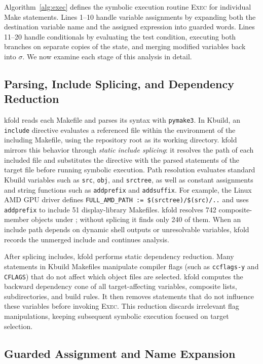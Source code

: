 \documentclass[acmsmall]{acmart}
\newcommand{\tool}{\textsf{kfold}\xspace}
\begin{document}
Algorithm~\ref{alg:exec} defines the symbolic execution routine \textsc{Exec} for individual Make statements.
Lines 1--10 handle variable assignments by expanding both the destination variable name and the assigned expression into guarded words.
Lines 11--20 handle conditionals by evaluating the test condition, executing both branches on separate copies of the state, and merging modified variables back into $\sigma$.
We now examine each stage of this analysis in detail.

\subsection{Parsing, Include Splicing, and Dependency Reduction}\label{sec:technique:include}

\tool reads each Makefile and parses its syntax with \texttt{pymake3}.
In Kbuild, an \texttt{include} directive evaluates a referenced file within the environment of the including Makefile, using the repository root as its working directory.
\tool mirrors this behavior through \emph{static include splicing}: it resolves the path of each included file and substitutes the directive with the parsed statements of the target file before running symbolic execution.
Path resolution evaluates standard Kbuild variables such as \texttt{src}, \texttt{obj}, and \texttt{srctree}, as well as constant assignments and string functions such as \texttt{addprefix} and \texttt{addsuffix}.
For example, the Linux AMD GPU driver defines \texttt{FULL\_AMD\_PATH := \$(srctree)/\$(src)/..} and uses \texttt{addprefix} to include 51 display-library Makefiles.
\tool resolves 742 composite-member objects under ; without splicing it finds only 240 of them.
When an include path depends on dynamic shell outputs or unresolvable variables, \tool records the unmerged include and continues analysis.

After splicing includes, \tool performs static dependency reduction.
Many statements in Kbuild Makefiles manipulate compiler flags (such as \texttt{ccflags-y} and \texttt{CFLAGS}) that do not affect which object files are selected.
\tool computes the backward dependency cone of all target-affecting variables, composite lists, subdirectories, and build rules.
It then removes statements that do not influence these variables before invoking \textsc{Exec}.
This reduction discards irrelevant flag manipulations, keeping subsequent symbolic execution focused on target selection.

\subsection{Guarded Assignment and Name Expansion}\label{sec:technique:assign}
\end{document}

